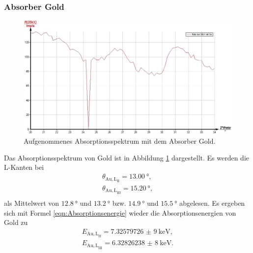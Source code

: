 \subsubsection{Absorber Gold}
\begin{figure}
	\includegraphics[width=1.0\textwidth]{nIKO_und_jULIAN_ÜLADS/gold.jpg}
	\caption{Aufgenommenes Absorptionsspektrum mit dem Absorber Gold.}
	\label{fig:gold_absorber}
\end{figure}
Das Absorptionsspektrum von Gold ist in Abbildung \ref{fig:gold_absorber} dargestellt.
Es werden die L-Kanten bei
\begin{gather*}
	\theta_{\mathrm{Au,L}_{\mathrm{II}}} = \SI{13,00}{\degree} \mathrm{,} \\
	\theta_{\mathrm{Au,L}_{\mathrm{III}}} = \SI{15,20}{\degree} \mathrm{,} \\
\end{gather*}
als Mittelwert von $\SI{12,8}{\degree}$ und $\SI{13,2}{\degree}$ bzw. $\SI{14,9}{\degree}$
und $\SI{15,5}{\degree}$ abgelesen.
Es ergeben sich mit Formel \eqref{eqn:Absorptionsenergie} wieder die Absorptionsenergien von
Gold zu
\begin{gather*}
	E_{\mathrm{Au,L}_{\mathrm{II}}} = \SI{7,32579726(9)}{\kilo\electronvolt} \mathrm{,} \\
	E_{\mathrm{Au,L}_{\mathrm{III}}} = \SI{6,32826238(8)}{\kilo\electronvolt} \mathrm{.} \\
\end{gather*}
